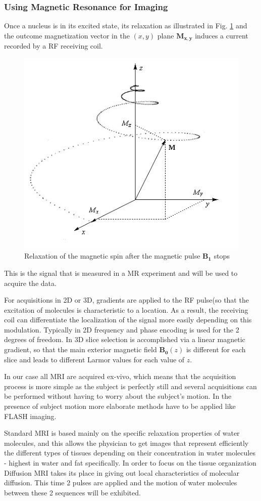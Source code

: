 \subsubsection{Using Magnetic Resonance for Imaging}

Once a nucleus is in its excited state, its relaxation as illustrated in Fig. \ref{fig:spin_relaxation} and the outcome magnetization vector in the $(x, y)$ plane $\mathbf{M_{x, y}}$ induces a current recorded by a RF receiving coil.
\begin{figure}
    \centering
    \includegraphics[width=.5\textwidth]{figures/spin_relaxation}
    \caption{Relaxation of the magnetic spin after the magnetic pulse $\mathbf{B_1}$ stops}
    \label{fig:spin_relaxation}
\end{figure}

This is the signal that is measured in a MR experiment and will be used to acquire the data.

For acquisitions in 2D or 3D, gradients are applied to the RF pulse(so that the excitation of molecules is characteristic to a location. As a result, the receiving coil can differentiate the localization of the signal more easily depending on this modulation. Typically in 2D frequency and phase encoding is used for the 2 degrees of freedom. In 3D slice selection is accomplished via a linear magnetic gradient, so that the main exterior magnetic field $\mathbf{B_0}(z)$ is different for each slice and leads to different Larmor values for each value of $z$.

In our case all MRI are acquired ex-vivo, which means that the acquisition process is more simple as the subject is perfectly still and several acquisitions can be performed without having to worry about the subject's motion. In the presence of subject motion more elaborate methods have to be applied like FLASH imaging.

Standard MRI is based mainly on the specific relaxation properties of water molecules, and this allows the physician to get images that represent efficiently the different types of tissues depending on their concentration in water molecules - highest in water and fat specifically. In order to focus on the tissue organization Diffusion MRI takes its place in giving out local characteristics of molecular diffusion. This time 2 pulses are applied and the motion of water molecules between these 2 sequences will be exhibited.

